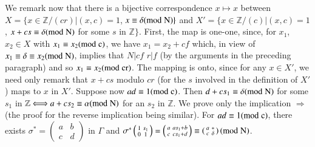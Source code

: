 We remark now that there is a bijective correspondence $x\mapsto x$
between $X=\{x\in\mathbb{Z}/(cr)|(x,c)=1$, $x\equiv \delta(\rm{mod} \; N)\}$
and $X'=\{x\in\mathbb{Z}/(c)|(x,c)=1$, $x+cs\equiv \delta(\rm{mod} \; N)$ for
some $s$ in $\mathbb{Z}\}$. First, the map is one-one, since, for
$x_{1}$, $x_{2}\in X$ with $x_{1}\equiv x_{2}(\rm{mod} \; c)$, we have
$x_{1}=x_{2}+cf$ which, in view of $x_{1}\equiv \delta\equiv
x_{2}(\rm{mod} \; N)$, implies that $N|cf$ \ie $r|f$ (by the arguments in the
preceding paragraph) and so $x_{1}\equiv x_{2}(\rm{mod} \; cr)$. The mapping
is onto, since for any $x\in X'$, we need only remark that $x+cs$
modulo $cr$ (for the $s$ involved in the definition of $X'$) maps to
$x$ in $X'$. Suppose now $ad\equiv 1(\rm{mod} \; c)$. Then $d+cs_{1}\equiv
\delta(\rm{mod} \; N)$ for some $s_{1}$ in $\mathbb{Z}\Longleftrightarrow
a+cs_{2}\equiv \alpha(\rm{mod} \; N)$ for an $s_{2}$ in $\mathbb{Z}$. We
prove only the implication $\Longrightarrow$ (the proof for the
reverse implication being similar). For $ad\equiv 1(\rm{mod} \; c)$, there
exists $\sigma^{\ast}=\left(\begin{smallmatrix} a & b\\ c & d
\end{smallmatrix}\right)$ in $\Gamma$ and
$\sigma^{\ast}\left(\begin{smallmatrix} 1 & s_{1}\\ 0 & 1
\end{smallmatrix}\right)=\left(\begin{smallmatrix} a & as_{1}+b\\ c &
  cs_{1}+d
\end{smallmatrix}\right)\equiv \left(\begin{smallmatrix} a & \ast\\ c
  &\delta\end{smallmatrix}\right)(\rm{mod} \; N)$.

